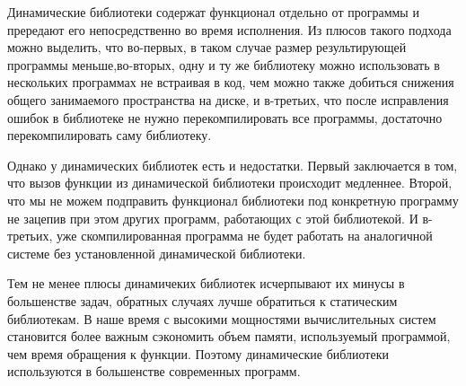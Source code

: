 \documentclass[pdf, unicode, 12pt, a4paper,oneside,fleqn]{article}
\begin{document}
Динамические библиотеки содержат функционал отдельно от программы и прередают его
непосредственно во время исполнения. Из плюсов такого подхода можно выделить, что 
во-первых, в таком случае размер результирующей программы меньше,во-вторых, одну и ту же библиотеку 
можно использовать в нескольких программах не встраивая в код, чем можно также добиться снижения
общего занимаемого пространства на диске, и в-третьих, что после исправления ошибок
в библиотеке не нужно перекомпилировать все программы, достаточно перекомпилировать саму библиотеку.

Однако у динамических библиотек есть и недостатки. Первый заключается в том, что
вызов функции из динамической библиотеки происходит медленнее. Второй, что
мы не можем подправить функционал библиотеки под конкретную программу не зацепив
при этом других программ, работающих с этой библиотекой. И в-третьих, уже скомпилированная
программа не будет работать на аналогичной системе без установленной динамической библиотеки.

Тем не менее плюсы динамичеких библиотек исчерпывают их минусы в большенстве задач, 
обратных случаях лучше обратиться к статическим библиотекам. В наше время с высокими мощностями 
вычислительных систем становится более важным сэкономить объем памяти, используемый программой,
чем время обращения к функции. Поэтому динамические библиотеки используются в большенстве 
современных программ.
\end{document}
